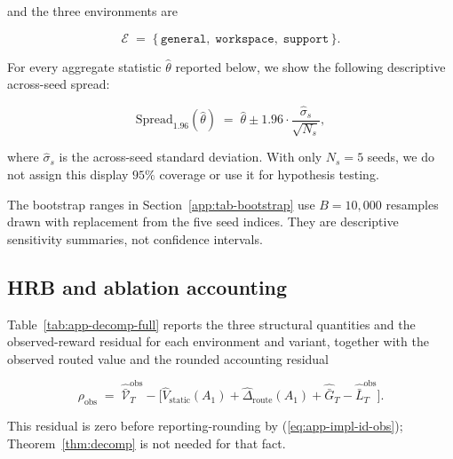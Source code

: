 \documentclass{article} %
\renewcommand{\eqref}[1]{\textup{(\ref{#1})}}
\begin{document}
and the three environments are

\begin{equation}
\label{eq:app-tab-envs}
\mathcal{E} \;=\; \{\,\texttt{general},\; \texttt{workspace},\; \texttt{support}\,\}.
\end{equation}

For every aggregate statistic \(\widehat\theta\) reported below, we show the
following descriptive across-seed spread:

\begin{equation}
\label{eq:app-tab-spread}
\mathrm{Spread}_{1.96}(\widehat\theta)
\;=\;
\widehat\theta \pm 1.96\cdot \frac{\widehat\sigma_s}{\sqrt{N_s}},
\end{equation}

where \(\widehat\sigma_s\) is the across-seed standard deviation. With only
\(N_s=5\) seeds, we do not assign this display \(95\%\) coverage or use it for
hypothesis testing.

The bootstrap ranges in Section~\ref{app:tab-bootstrap} use \(B=10{,}000\)
resamples drawn with replacement from the five seed indices. They are
descriptive sensitivity summaries, not confidence intervals.

\subsection{HRB and ablation accounting}

\label{app:tab-decomp}

Table~\ref{tab:app-decomp-full} reports the three structural quantities and the
observed-reward residual for each environment and variant, together with the
observed routed value and the rounded accounting residual

\begin{equation}
\label{eq:app-tab-residual}
\rho_{\mathrm{obs}}
\;=\;
\widehat{\bar{\mathcal V}}_T^{\mathrm{obs}}
- \big[\widehat V_{\mathrm{static}}(A_1)
+ \widehat\Delta_{\mathrm{route}}(A_1)
+ \widehat{\bar G}_T
- \widehat{\bar L}_T^{\mathrm{obs}}\big].
\end{equation}

This residual is zero before reporting-rounding by
\eqref{eq:app-impl-id-obs}; Theorem~\ref{thm:decomp} is not needed for that
fact.
\end{document}
